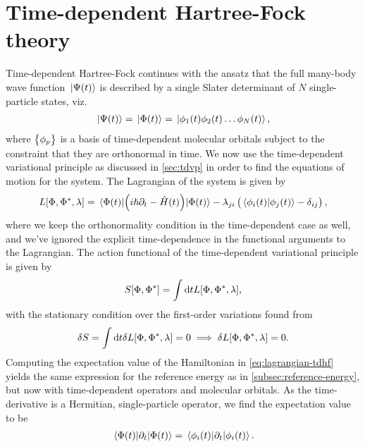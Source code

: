 \section{Time-dependent Hartree-Fock theory}
    Time-dependent Hartree-Fock continues with the ansatz that the full
    many-body wave function $\ket*{\Psi(t)}$ is described by a single Slater
    determinant of $N$ single-particle states, viz.
    \begin{align}
        \ket*{\Psi(t)} = \ket*{\Phi(t)}
        = \ket*{\phi_1(t) \phi_2(t)\dots \phi_N(t)},
    \end{align}
    where $\left\{ \phi_p \right\}$ is a basis of time-dependent molecular orbitals
    subject to the constraint that they are orthonormal in time.
    We now use the time-dependent variational principle as discussed in
    \autoref{sec:tdvp} in order to find the equations of motion for the system.
    The Lagrangian of the system is given by
    \begin{align}
        L[\Phi, \Phi^{*}, \lambda]
        = \mel*{\Phi(t)}{\left( 
            i\hslash\partial_t
            - \hat{H}(t)
         \right)}{\Phi(t)}
        - \lambda_{ji}\left( 
            \braket*{\phi_i(t)}{\phi_j(t)}
            - \delta_{ij}
         \right),
        \label{eq:lagrangian-tdhf}
    \end{align}
    where we keep the orthonormality condition in the time-dependent case as
    well, and we've ignored the explicit time-dependence in the functional
    arguments to the Lagrangian.
    The action functional of the time-dependent variational principle is given
    by
    \begin{align}
        S[\Phi, \Phi^{*}]
        =
        \int \dd t L[\Phi, \Phi^{*}, \lambda],
    \end{align}
    with the stationary condition over the first-order variations found from
    \begin{align}
        \delta S
        = \int\dd t \delta L[\Phi, \Phi^{*}, \lambda]
        = 0
        \implies
        \delta L[\Phi, \Phi^{*}, \lambda]
        = 0.
    \end{align}
    Computing the expectation value of the Hamiltonian in
    \autoref{eq:lagrangian-tdhf} yields the same expression for the reference
    energy as in \autoref{subsec:reference-energy}, but now with time-dependent
    operators and molecular orbitals.
    As the time-derivative is a Hermitian, single-particle operator, we find the
    expectation value to be
    \begin{align}
        \mel*{\Phi(t)}{\partial_t}{\Phi(t)}
        = \mel*{\phi_i(t)}{\partial_t}{\phi_i(t)}.
    \end{align}
